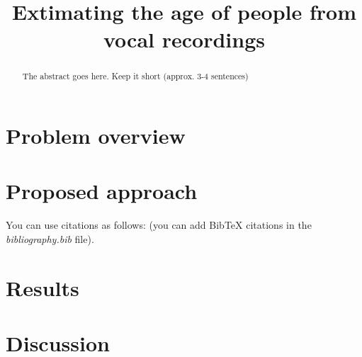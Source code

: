 \documentclass[conference]{IEEEtran}
\begin{document}
\title{Extimating the age of people from vocal recordings}

\author{
\and
{}
}

\maketitle

\begin{abstract}
The abstract goes here. Keep it short (approx. 3-4 sentences)
\end{abstract}

\section{Problem overview}


\section{Proposed approach}


You can use citations as follows: \cite{goodfellow2016deep} (you can add BibTeX citations in the \textit{bibliography.bib} file).


\section{Results}


\section{Discussion}





\end{document}
